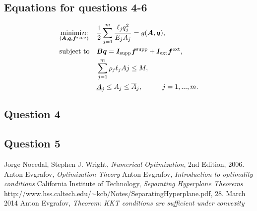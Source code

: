 \documentclass[10pt,a4paper]{article}
\begin{document}
\subsection*{Equations for questions 4-6}

\begin{equation}
 \begin{aligned}
 \label{eq:system6}
 & \underset{(\bm{A},\bm{q},\bm{f}^{\textrm{supp}})}{\text{minimize}}
 & & \frac{1}{2}\sum_{j=1}^{m}\frac{\ell_{j}q_{j}^{2}}{E_{j}A_{j}} = g(\bm{A}, \bm{q}), \\
 & \text{subject to}
 & & \bm{Bq} = \bm{I}_{\textrm{supp}}\bm{f}^{\textrm{supp}} + \bm{I}_{\textrm{ext}}\bm{f}^{\textrm{ext}},\\
 & & & \sum_{j=1}^{m}{\rho_{j}\ell_{j}A{j}} \leq M,\\
 & & & \underline{A}_{j} \leq A_{j} \leq \overline{A}_{j}, \hspace{10 mm}  j = 1,...,m.
 \end{aligned}
\end{equation}








\subsection*{Question 4}



\subsection*{Question 5}





\begin{thebibliography}{}

Jorge Nocedal, Stephen J. Wright, \emph{Numerical Optimization}, 2nd Edition, 2006.
Anton Evgrafov, \emph{Optimization Theory} 
Anton Evgrafov, \emph{Introduction to optimality conditions}
California Institute of Technology, \emph{Separating Hyperplane Theorems} http://www.hss.caltech.edu/$\sim$kcb/Notes/SeparatingHyperplane.pdf, 28. March 2014
Anton Evgrafov, \emph{Theorem: KKT conditions are sufficient under convexity}

\end{thebibliography}
\end{document}
